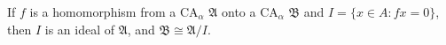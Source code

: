 If $f$ is a homomorphism from a $\mathrm{CA}_{\alpha}$ $\mathfrak{A}$ onto a $\mathrm{CA}_{\alpha}$ $\mathfrak{B}$ and $I = \{x \in A : fx = 0\}$, then $I$ is an ideal of $\mathfrak{A}$, and $\mathfrak{B} \cong \mathfrak{A}/I$.
